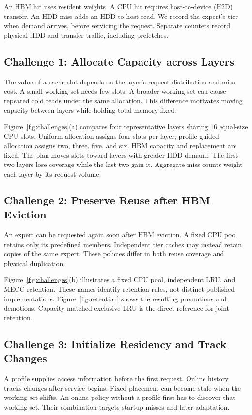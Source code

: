\documentclass[conference,9pt,letterpaper]{IEEEtran}
\begin{document}
An HBM hit uses resident weights. A CPU hit requires host-to-device (H2D) transfer. An HDD miss adds an HDD-to-host read. We record the expert's tier when demand arrives, before servicing the request. Separate counters record physical HDD and transfer traffic, including prefetches.

\subsection{Challenge 1: Allocate Capacity across Layers}
The value of a cache slot depends on the layer's request distribution and miss cost. A small working set needs few slots. A broader working set can cause repeated cold reads under the same allocation. This difference motivates moving capacity between layers while holding total memory fixed.

Figure~\ref{fig:challenges}(a) compares four representative layers sharing 16 equal-size CPU slots. Uniform allocation assigns four slots per layer; profile-guided allocation assigns two, three, five, and six. HBM capacity and replacement are fixed. The plan moves slots toward layers with greater HDD demand. The first two layers lose coverage while the last two gain it. Aggregate miss counts weight each layer by its request volume.

\subsection{Challenge 2: Preserve Reuse after HBM Eviction}
An expert can be requested again soon after HBM eviction. A fixed CPU pool retains only its predefined members. Independent tier caches may instead retain copies of the same expert. These policies differ in both reuse coverage and physical duplication.

Figure~\ref{fig:challenges}(b) illustrates a fixed CPU pool, independent LRU, and MECC retention. These names identify retention rules, not distinct published implementations. Figure~\ref{fig:retention} shows the resulting promotions and demotions. Capacity-matched exclusive LRU is the direct reference for joint retention.

\subsection{Challenge 3: Initialize Residency and Track Changes}
A profile supplies access information before the first request. Online history tracks changes after service begins. Fixed placement can become stale when the working set shifts. An online policy without a profile first has to discover that working set. Their combination targets startup misses and later adaptation.
\end{document}
